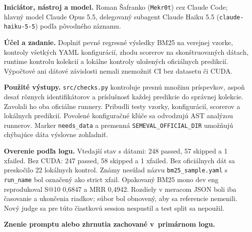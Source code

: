 \par\noindent \textbf{Iniciátor, nástroj a model.} Roman Šafranko (\texttt{Mekr0t}) cez Claude Code; hlavný model Claude Opus 5.5, delegovaný subagent Claude Haiku 5.5 (\texttt{claude-\allowbreak{}haiku-\allowbreak{}5-\allowbreak{}5}) podľa pôvodného záznamu.\par\smallskip
\par\noindent \textbf{Účel a zadanie.} Doplniť pevné regresné výsledky BM25 na verejnej vzorke, kontroly všetkých YAML konfigurácií, zhodu scorerov na skonštruovaných dátach, runtime kontrolu kolekcií a lokálne kontroly uložených oficiálnych predikcií. Výpočtové ani dátové závislosti nemali znemožniť CI bez datasetu či CUDA.\par\smallskip
\par\noindent \textbf{Použité výstupy.} \texttt{src/\allowbreak{}checks.\allowbreak{}py} kontroluje presnú množinu príspevkov, aspoň desať rôznych identifikátorov a príslušnosť každej predikcie do správnej kolekcie. Zavolali ho oba oficiálne runnery. Pribudli testy vzorky, konfigurácií, scorerov a lokálnych predikcií. Povolené konfiguračné kľúče sa odvodzujú AST analýzou runnerov. Marker \texttt{needs\_\allowbreak{}data} a premenná \texttt{SEMEVAL\_\allowbreak{}OFFICIAL\_\allowbreak{}DIR} umožňujú chýbajúce dáta výslovne zohľadniť.\par\smallskip
\par\noindent \textbf{Overenie podľa logu.} Vtedajší stav s dátami: 248 passed, 57 skipped a 1 xfailed. Bez CUDA: 247 passed, 58 skipped a 1 xfailed. Bez oficiálnych dát sa preskočilo 22 lokálnych kontrol. Známy nesúlad názvu \texttt{bm25\_\allowbreak{}sample.\allowbreak{}yaml} s \texttt{run\_\allowbreak{}name} bol označený ako strict xfail. Opakovaný BM25 mono dev eng reprodukoval S@10 0,6847 a MRR 0,4942. Rozdiely v meracom JSON boli iba časovanie a ukončenia riadkov; súbor bol obnovený, aby sa referencie nemenili. Nový judge sa pre túto čiastkovú session nespustil a test split sa nepoužil.\par\smallskip

\par\noindent\textbf{Znenie promptu alebo zhrnutia zachované v~primárnom logu.}

